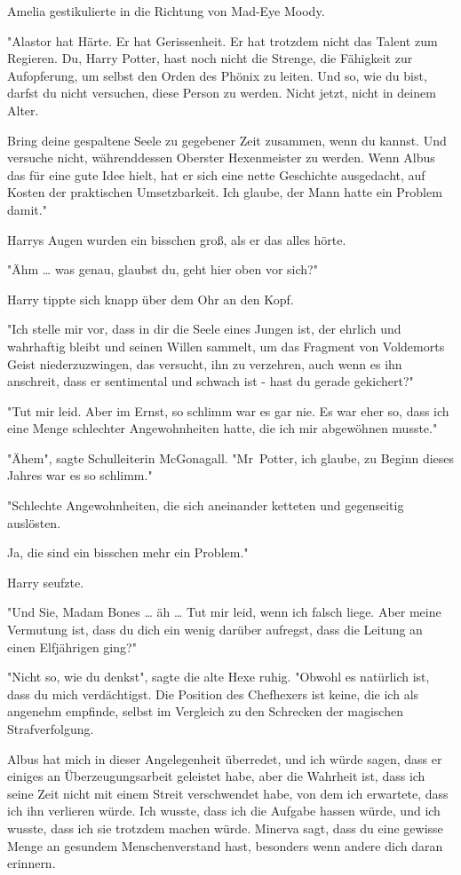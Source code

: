 {Amelia gestikulierte in die Richtung von Mad-Eye Moody.

"Alastor hat Härte. Er hat Gerissenheit. Er hat trotzdem nicht das Talent zum Regieren. Du, Harry Potter, hast noch nicht die Strenge, die Fähigkeit zur Aufopferung, um selbst den Orden des Phönix zu leiten. Und so, wie du bist, darfst du nicht versuchen, diese Person zu werden. Nicht jetzt, nicht in deinem Alter.

Bring deine gespaltene Seele zu gegebener Zeit zusammen, wenn du kannst. Und versuche nicht, währenddessen Oberster Hexenmeister zu werden. Wenn Albus das für eine gute Idee hielt, hat er sich eine nette Geschichte ausgedacht, auf Kosten der praktischen Umsetzbarkeit. Ich glaube, der Mann hatte ein Problem damit."

Harrys Augen wurden ein bisschen groß, als er das alles hörte.

"Ähm … was genau, glaubst du, geht hier oben vor sich?"

Harry tippte sich knapp über dem Ohr an den Kopf.

"Ich stelle mir vor, dass in dir die Seele eines Jungen ist, der ehrlich und wahrhaftig bleibt und seinen Willen sammelt, um das Fragment von Voldemorts Geist niederzuzwingen, das versucht, ihn zu verzehren, auch wenn es ihn anschreit, dass er sentimental und schwach ist - hast du gerade gekichert?"

"Tut mir leid. Aber im Ernst, so schlimm war es gar nie. Es war eher so, dass ich eine Menge schlechter Angewohnheiten hatte, die ich mir abgewöhnen musste."

"Ähem", sagte Schulleiterin McGonagall. "Mr~Potter, ich glaube, zu Beginn dieses Jahres war es so schlimm."

"Schlechte Angewohnheiten, die sich aneinander ketteten und gegenseitig auslösten.

Ja, die sind ein bisschen mehr ein Problem."

Harry seufzte.

"Und Sie, Madam Bones … äh … Tut mir leid, wenn ich falsch liege. Aber meine Vermutung ist, dass du dich ein wenig darüber aufregst, dass die Leitung an einen Elfjährigen ging?"

"Nicht so, wie du denkst", sagte die alte Hexe ruhig. "Obwohl es natürlich ist, dass du mich verdächtigst. Die Position des Chefhexers ist keine, die ich als angenehm empfinde, selbst im Vergleich zu den Schrecken der magischen Strafverfolgung.

Albus hat mich in dieser Angelegenheit überredet, und ich würde sagen, dass er einiges an Überzeugungsarbeit geleistet habe, aber die Wahrheit ist, dass ich seine Zeit nicht mit einem Streit verschwendet habe, von dem ich erwartete, dass ich ihn verlieren würde. Ich wusste, dass ich die Aufgabe hassen würde, und ich wusste, dass ich sie trotzdem machen würde. Minerva sagt, dass du eine gewisse Menge an gesundem Menschenverstand hast, besonders wenn andere dich daran erinnern.

}
